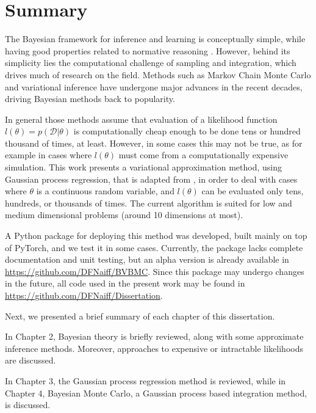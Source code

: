 \chapter{Summary}


The Bayesian framework for inference and learning is conceptually simple, while having good properties related to normative reasoning \cite{Ghahramani_2015}. However, behind its simplicity lies the computational challenge of sampling and integration, which drives much of research on the field. Methods such as Markov Chain Monte Carlo and variational inference have undergone major advances in the recent decades, driving Bayesian methods back to popularity.

In general those methods assume that evaluation of a likelihood function $l(\theta) = p(\mathcal{D}|\theta)$ is computationally cheap enough to be done tens or hundred thousand of times, at least. However, in some cases this may not be true, as for example in cases where $l(\theta)$ must come from a computationally expensive simulation. This work presents a variational approximation method, using Gaussian process regression, that is adapted from \cite{Acerbi_2018,Guo_2016}, in order to deal with cases where $\theta$ is a continuous random variable, and $l(\theta)$ can be evaluated only tens, hundreds, or thousands of times. The current algorithm is suited for low and medium dimensional problems (around 10 dimensions at most).

A Python package for deploying this method was developed, built mainly on top of PyTorch, and we test it in some cases. Currently, the package lacks complete documentation and unit testing, but an alpha version is already available in \url{https://github.com/DFNaiff/BVBMC}. Since this package may undergo changes in the future, all code used in the present work may be found in \url{https://github.com/DFNaiff/Dissertation}.

Next, we presented a brief summary of each chapter of this dissertation.

In Chapter 2, Bayesian theory is briefly reviewed, along with some approximate inference methods. Moreover, approaches to expensive or intractable likelihoods are discussed.

In Chapter 3, the Gaussian process regression method is reviewed, while in Chapter 4, Bayesian Monte Carlo, a Gaussian process based integration method, is discussed.


